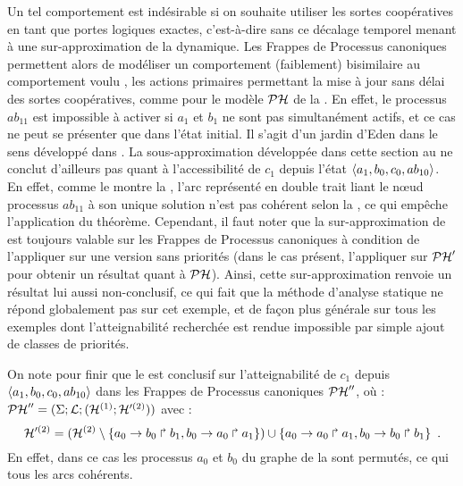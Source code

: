 \begin{example}
  Un tel comportement est indésirable si on souhaite utiliser les sortes coopératives en tant
  que portes logiques exactes, c'est-à-dire sans ce décalage temporel menant à une sur-approximation
  de la dynamique.
  Les Frappes de Processus canoniques permettent alors de modéliser un comportement (faiblement)
  bisimilaire au comportement voulu , les actions primaires permettant la mise à jour
  sans délai des sortes coopératives, comme pour le modèle $\mathcal{PH}$ de la .
  En effet, le processus $ab_{11}$ est impossible à activer si $a_1$ et $b_1$ ne sont
  pas simultanément actifs, et ce cas ne peut se présenter que dans l'état initial.
  Il s'agit d'un jardin d'Eden dans le sens développé dans .
  La sous-approximation développée dans cette section au 
  ne conclut d'ailleurs pas quant à l'accessibilité de $c_1$ depuis l'état
  $\mbox{$\langle a_1, b_0, c_0, ab_{10} \rangle$}$.
  En effet, comme le montre la ,
  l'arc représenté en double trait liant le nœud processus $ab_{11}$ à son unique solution
  n'est pas cohérent selon la
  , ce qui empêche l'application du théorème.
  Cependant, il faut noter que la sur-approximation de~\cite{PMR12-MSCS}
  est toujours valable sur les Frappes de Processus canoniques à condition de l'appliquer
  sur une version sans priorités (\cad dans le cas présent, l'appliquer sur $\mathcal{PH}'$
  pour obtenir un résultat quant à $\mathcal{PH}$).
  Ainsi, cette sur-approximation renvoie un résultat lui aussi non-conclusif,
  ce qui fait que la méthode d'analyse statique ne répond globalement pas sur cet exemple,
  et de façon plus générale sur tous les exemples dont l'atteignabilité recherchée
  est rendue impossible par simple ajout de classes de priorités.
  
  On note pour finir que le  est conclusif sur l'atteignabilité de $c_1$
  depuis $\mbox{$\langle a_1, b_0, c_0, ab_{10} \rangle$}$ dans les Frappes de Processus canoniques $\mathcal{PH}''$, où :
  $\mathcal{PH}'' = (\Sigma; \mathcal{L}; (\mathcal{H}^{(1)};\mathcal{H}'^{(2)}))$ avec :
  \[\mathcal{H}'^{(2)} = (\mathcal{H}^{(2)} \setminus \{ a_0\rightarrow b_0\Rsh b_1, b_0\rightarrow a_0\Rsh a_1 \})
    \cup \{ a_0\rightarrow a_0\Rsh a_1, b_0\rightarrow b_0\Rsh b_1 \} \enspace.\]
  En effet, dans ce cas les processus $a_0$ et $b_0$ du graphe de la 
  sont permutés, ce qui tous les arcs cohérents.

\begin{figure}[tp]
  \centering
\end{figure}
\end{example}
